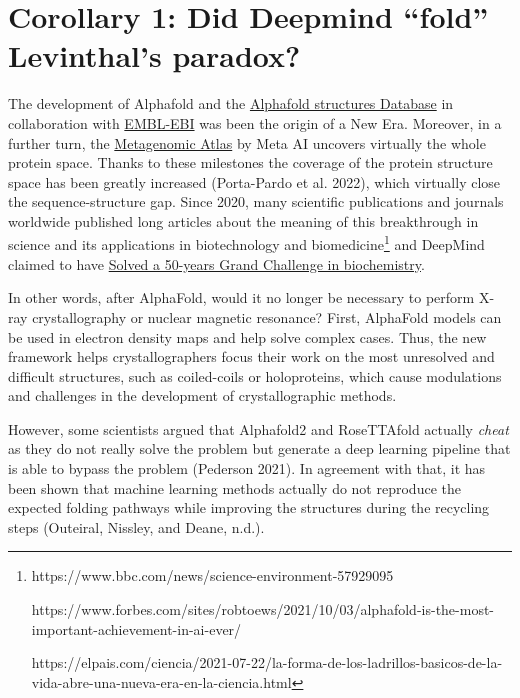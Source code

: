 \documentclass[
]{scrbook}
\begin{document}
\section{Corollary 1: Did Deepmind ``fold'' Levinthal's
paradox?}\label{corollary-1-did-deepmind-fold-levinthals-paradox}

The development of Alphafold and the
\href{https://alphafold.ebi.ac.uk/}{Alphafold structures Database} in
collaboration with \href{https://www.ebi.ac.uk/about}{EMBL-EBI} was been
the origin of a New Era. Moreover, in a further turn, the
\href{https://esmatlas.com/}{Metagenomic Atlas} by Meta AI uncovers
virtually the whole protein space. Thanks to these milestones the
coverage of the protein structure space has been greatly increased
(Porta-Pardo et al. 2022), which virtually close the sequence-structure
gap. Since 2020, many scientific publications and journals worldwide
published long articles about the meaning of this breakthrough in
science and its applications in biotechnology and biomedicine\footnote{https://www.bbc.com/news/science-environment-57929095

  https://www.forbes.com/sites/robtoews/2021/10/03/alphafold-is-the-most-important-achievement-in-ai-ever/

  https://elpais.com/ciencia/2021-07-22/la-forma-de-los-ladrillos-basicos-de-la-vida-abre-una-nueva-era-en-la-ciencia.html}
and DeepMind claimed to have
\href{https://www.deepmind.com/blog/alphafold-a-solution-to-a-50-year-old-grand-challenge-in-biology}{Solved
a 50-years Grand Challenge in biochemistry}.

In other words, after AlphaFold, would it no longer be necessary to
perform X-ray crystallography or nuclear magnetic resonance? First,
AlphaFold models can be used in electron density maps and help solve
complex cases. Thus, the new framework helps crystallographers focus
their work on the most unresolved and difficult structures, such as
coiled-coils or holoproteins, which cause modulations and challenges in
the development of crystallographic methods.

However, some scientists argued that Alphafold2 and RoseTTAfold actually
\emph{cheat} as they do not really solve the problem but generate a deep
learning pipeline that is able to bypass the problem (Pederson 2021). In
agreement with that, it has been shown that machine learning methods
actually do not reproduce the expected folding pathways while improving
the structures during the recycling steps (Outeiral, Nissley, and Deane,
n.d.).
\end{document}
